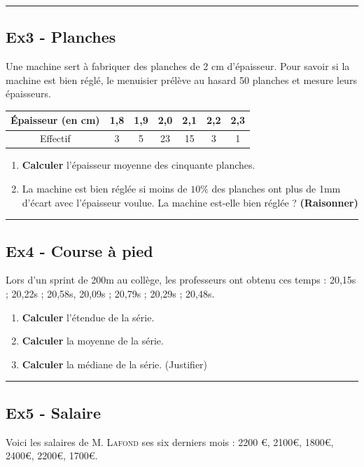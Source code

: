 \documentclass[12pt]{article}
\newcommand{\horrule}[1]{\rule{\linewidth}{#1}} %
\begin{document}
\begin{multicols}{2}
\horrule{1px}
\subsection*{Ex3 - Planches}

Une machine sert à fabriquer des planches de 2 cm d'épaisseur. Pour savoir si la machine est bien réglé, le menuisier prélève au hasard 50 planches et mesure leurs épaisseurs.

\begin{center}
  \begin{tabular}{|c||c|c|c|c|c|c|}
    \hline
    Épaisseur (en cm)   & 1,8 & 1,9 & 2,0 & 2,1 & 2,2 & 2,3 \\
    \hline 
    Effectif & 3 & 5 & 23 & 15 & 3 & 1 \\
    \hline
  \end{tabular}
\end{center}

\begin{enumerate}
\item[1.] \textbf{Calculer} l'épaisseur moyenne des cinquante planches.
\item[2.] La machine est bien réglée si moins de $10\%$ des planches ont plus de 1mm d'écart avec l'épaisseur voulue. La machine est-elle bien réglée ? \textbf{(Raisonner)}
\end{enumerate}

\horrule{1px}
\subsection*{Ex4 - Course à pied}

Lors d'un sprint de 200m au collège, les professeurs ont obtenu ces temps : 20,15s ; 20,22s ; 20,58s, 20,09s ; 20,79s ; 20,29s ; 20,48s.

\begin{enumerate}
\item[1.] \textbf{Calculer} l'étendue de la série.
\item[2.] \textbf{Calculer} la moyenne de la série.
\item[3.] \textbf{Calculer} la médiane de la série. (Justifier)
\end{enumerate}

\horrule{1px}
\subsection*{Ex5 - Salaire}

Voici les salaires de \textsc{M. Lafond} ses six derniers mois : 2200 \euro, 2100\euro, 1800\euro, 2400\euro, 2200\euro, 1700\euro.


\end{multicols}
\end{document}
